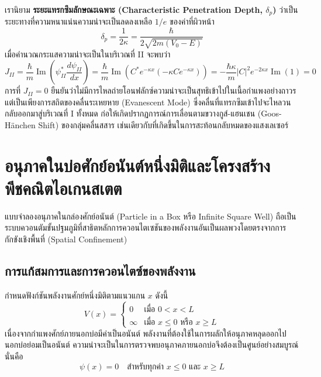 เรานิยาม \textbf{ระยะแทรกซึมลักษณะเฉพาะ (Characteristic Penetration Depth, $\delta_p$)} ว่าเป็นระยะทางที่ความหนาแน่นความน่าจะเป็นลดลงเหลือ $1/e$ ของค่าที่ผิวหน้า
\begin{equation}
\delta_p = \frac{1}{2\kappa} = \frac{\hbar}{2\sqrt{2m(V_0 - E)}}
\end{equation}
เมื่อคำนวณกระแสความน่าจะเป็นในบริเวณที่ II จะพบว่า
\begin{equation}
J_{II} = \frac{\hbar}{m} \operatorname{Im}\left( \psi_{II}^* \frac{d\psi_{II}}{dx} \right) = \frac{\hbar}{m} \operatorname{Im}\left( C^* e^{-\kappa x} (-\kappa C e^{-\kappa x}) \right) = -\frac{\hbar\kappa}{m} |C|^2 e^{-2\kappa x} \operatorname{Im}(1) = 0
\end{equation}
การที่ $J_{II} = 0$ ยืนยันว่าไม่มีการไหลถ่ายโอนฟลักซ์ความน่าจะเป็นสุทธิเข้าไปในเนื้อกำแพงอย่างถาวร แต่เป็นเพียงการสถิตของคลื่นระเหยหาย (Evanescent Mode) ซึ่งคลื่นที่แทรกซึมเข้าไปจะไหลวนกลับออกมาสู่บริเวณที่ I ทั้งหมด ก่อให้เกิดปรากฏการณ์การเลื่อนตามขวางกูส์-แฮนเชน (Goos-Hänchen Shift) ของกลุ่มคลื่นสสาร เช่นเดียวกับที่เกิดขึ้นในการสะท้อนกลับหมดของแสงเลเซอร์

\section{อนุภาคในบ่อศักย์อนันต์หนึ่งมิติและโครงสร้างพีชคณิตไอเกนสเตต}
\label{sec_infinite_well}

แบบจำลองอนุภาคในกล่องศักย์อนันต์ (Particle in a Box หรือ Infinite Square Well) ถือเป็นระบบควอนตัมขั้นปฐมภูมิที่สาธิตหลักการควอนไตเซชันของพลังงานอันเป็นผลพวงโดยตรงจากการกักขังเชิงพื้นที่ (Spatial Confinement)

\subsection{การแก้สมการและการควอนไตซ์ของพลังงาน}
กำหนดฟังก์ชันพลังงานศักย์หนึ่งมิติตามแนวแกน $x$ ดังนี้
\begin{equation}
V(x) = \begin{cases}
0 & \text{เมื่อ } 0 < x < L \\
\infty & \text{เมื่อ } x \le 0 \text{ หรือ } x \ge L
\end{cases}
\end{equation}
เนื่องจากกำแพงศักย์ภายนอกบ่อมีค่าเป็นอนันต์ พลังงานที่ต้องใช้ในการผลักให้อนุภาคหลุดออกไปนอกบ่อย่อมเป็นอนันต์ ความน่าจะเป็นในการตรวจพบอนุภาคภายนอกบ่อจึงต้องเป็นศูนย์อย่างสมบูรณ์ นั่นคือ
\begin{equation}
\psi(x) = 0 \quad \text{สำหรับทุกค่า } x \le 0 \text{ และ } x \ge L
\end{equation}

